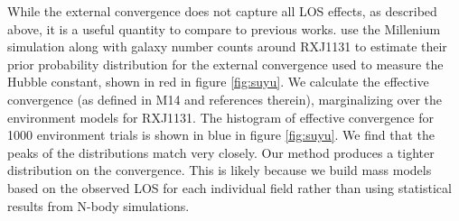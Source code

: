 While the external convergence does not capture all LOS effects, as described above, it is a useful quantity to compare to previous works. \citet{Suyu13} use the Millenium simulation along with galaxy number counts around RXJ1131 to estimate their prior probability distribution for the external convergence used to measure the Hubble constant, shown in red in figure \ref{fig:suyu}. We calculate the effective convergence (as defined in M14 and references therein), marginalizing over the environment models for RXJ1131. The histogram of effective convergence for 1000 environment trials is shown in blue in figure \ref{fig:suyu}. We find that the peaks of the distributions match very closely. Our method produces a tighter distribution on the convergence. This is likely because we build mass models based on the observed LOS for each individual field rather than using statistical results from N-body simulations.